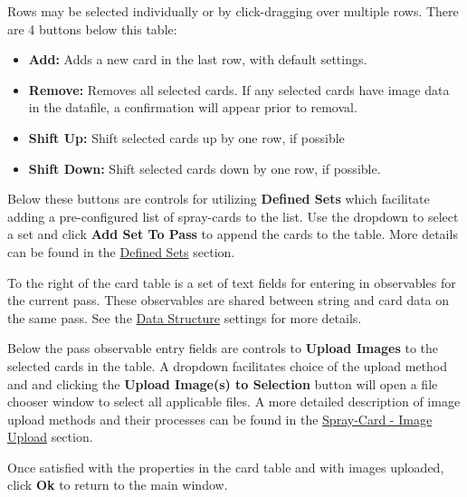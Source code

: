 \documentclass[10pt,letterpaper,titlepage]{article}
\begin{document}
    Rows may be selected individually or by click-dragging over multiple rows. There are 4 buttons below this table:
    \begin{itemize}
        \item \textbf{Add:} Adds a new card in the last row, with default settings.
        \item \textbf{Remove:} Removes all selected cards. If any selected cards have image data in the datafile, a confirmation will appear prior to removal.
        \item \textbf{Shift Up:} Shift selected cards up by one row, if possible
        \item \textbf{Shift Down:} Shift selected cards down by one row, if possible.
    \end{itemize}
    Below these buttons are controls for utilizing \textbf{Defined Sets} which facilitate adding a pre-configured list of spray-cards to the list. Use the dropdown to select a set and click \textbf{Add Set To Pass} to append the cards to the table. More details can be found in the \hyperref[sec:defined_sets]{Defined Sets} section.\par
    To the right of the card table is a set of text fields for entering in observables for the current pass. These observables are shared between string and card data on the same pass. See the \hyperref[sec:data]{Data Structure} settings for more details.\par
    Below the pass observable entry fields are controls to \textbf{Upload Images} to the selected cards in the table. A dropdown facilitates choice of the upload method and and clicking the \textbf{Upload Image(s) to Selection} button will open a file chooser window to select all applicable files. A more detailed description of image upload methods and their processes can be found in the \hyperref[sec:image_upload]{Spray-Card - Image Upload} section.\par
    Once satisfied with the properties in the card table and with images uploaded, click \textbf{Ok} to return to the main window.
    \FloatBarrier
\end{document}
